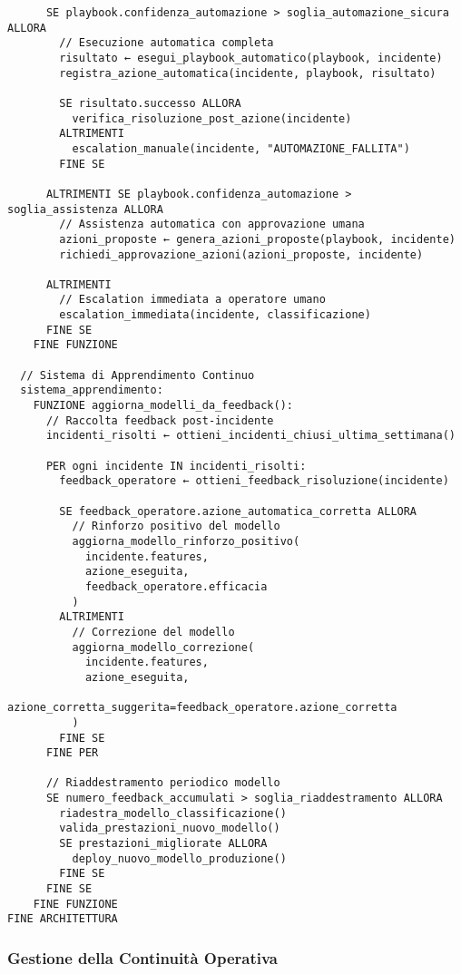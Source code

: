{\begin{verbatim}
      SE playbook.confidenza_automazione > soglia_automazione_sicura ALLORA
        // Esecuzione automatica completa
        risultato ← esegui_playbook_automatico(playbook, incidente)
        registra_azione_automatica(incidente, playbook, risultato)
        
        SE risultato.successo ALLORA
          verifica_risoluzione_post_azione(incidente)
        ALTRIMENTI
          escalation_manuale(incidente, "AUTOMAZIONE_FALLITA")
        FINE SE
        
      ALTRIMENTI SE playbook.confidenza_automazione > soglia_assistenza ALLORA
        // Assistenza automatica con approvazione umana
        azioni_proposte ← genera_azioni_proposte(playbook, incidente)
        richiedi_approvazione_azioni(azioni_proposte, incidente)
        
      ALTRIMENTI
        // Escalation immediata a operatore umano
        escalation_immediata(incidente, classificazione)
      FINE SE
    FINE FUNZIONE

  // Sistema di Apprendimento Continuo
  sistema_apprendimento:
    FUNZIONE aggiorna_modelli_da_feedback():
      // Raccolta feedback post-incidente
      incidenti_risolti ← ottieni_incidenti_chiusi_ultima_settimana()
      
      PER ogni incidente IN incidenti_risolti:
        feedback_operatore ← ottieni_feedback_risoluzione(incidente)
        
        SE feedback_operatore.azione_automatica_corretta ALLORA
          // Rinforzo positivo del modello
          aggiorna_modello_rinforzo_positivo(
            incidente.features,
            azione_eseguita,
            feedback_operatore.efficacia
          )
        ALTRIMENTI
          // Correzione del modello
          aggiorna_modello_correzione(
            incidente.features,
            azione_eseguita,
            azione_corretta_suggerita=feedback_operatore.azione_corretta
          )
        FINE SE
      FINE PER
      
      // Riaddestramento periodico modello
      SE numero_feedback_accumulati > soglia_riaddestramento ALLORA
        riadestra_modello_classificazione()
        valida_prestazioni_nuovo_modello()
        SE prestazioni_migliorate ALLORA
          deploy_nuovo_modello_produzione()
        FINE SE
      FINE SE
    FINE FUNZIONE
FINE ARCHITETTURA
\end{verbatim}

\subsubsection{Gestione della Continuità Operativa}

}
